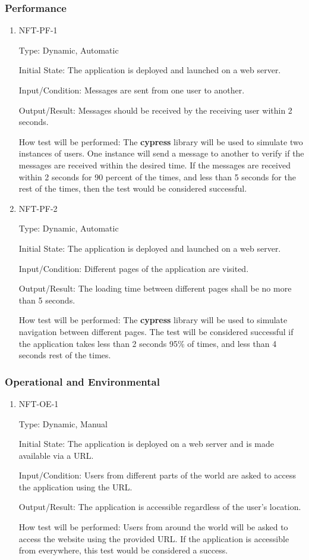 \documentclass[12pt, titlepage]{article}
\begin{document}
\subsubsection{Performance}
\begin{enumerate}
\item{NFT-PF-1}

Type: Dynamic, Automatic
					
Initial State: The application is deployed and launched on a web server.
					
Input/Condition: Messages are sent from one user to another.
					
Output/Result: Messages should be received by the receiving user within 2 seconds.
					
How test will be performed: The \textbf{cypress} library will be used to simulate two instances of users. One instance will send a message to another to verify if the messages are received within the desired time. If the messages are received within 2 seconds for 90 percent of the times, and less than 5 seconds for the rest of the times, then the test would be considered successful.

\item{NFT-PF-2}

Type: Dynamic, Automatic
					
Initial State: The application is deployed and launched on a web server.
					
Input/Condition: Different pages of the application are visited.
					
Output/Result: The loading time between different pages shall be no more than 5 seconds.
					
How test will be performed: The \textbf{cypress} library will be used to simulate navigation between different pages. The test will be considered successful if the application takes less than 2 seconds 95\% of times, and less than 4 seconds rest of the times.
\end{enumerate}

\subsubsection{Operational and Environmental}
\begin{enumerate}
\item{NFT-OE-1}

Type: Dynamic, Manual
					
Initial State: The application is deployed on a web server and is made available via a URL.
					
Input/Condition: Users from different parts of the world are asked to access the application using the URL.
					
Output/Result: The application is accessible regardless of the user's location.
					
How test will be performed: Users from around the world will be asked to access the website using the provided URL. If the application is accessible from everywhere, this test would be considered a success.
\end{enumerate}
\end{document}
